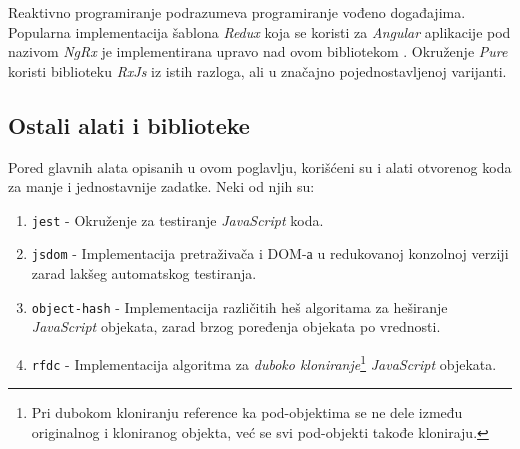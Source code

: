 \documentclass[12pt,oneside]{memoir}
\begin{document}
Reaktivno programiranje podrazumeva programiranje vođeno događajima. Popularna implementacija šablona \emph{Redux} koja se koristi za \emph{Angular} aplikacije
pod nazivom \emph{NgRx} je implementirana upravo nad ovom bibliotekom \cite{Redux} \cite{NgRx}. Okruženje \emph{Pure} koristi
biblioteku \emph{RxJs} iz istih razloga, ali u značajno pojednostavljenoj varijanti.
\subsection{Ostali alati i biblioteke}
Pored glavnih alata opisanih u ovom poglavlju, korišćeni su i alati otvorenog koda za manje i jednostavnije zadatke.
Neki od njih su:
\begin{enumerate}
  \item \texttt{jest} - Okruženje za testiranje \emph{JavaScript} koda.
  \item \texttt{jsdom} - Implementacija pretraživača i DOM-а u redukovanoj konzolnoj verziji zarad lakšeg automatskog testiranja.
  \item \texttt{object-hash} - Implementacija različitih heš algoritama za heširanje
  \emph{JavaScript} objekata, zarad brzog poređenja objekata po vrednosti.
  \item \texttt{rfdc} - Implementacija algoritma za \emph{duboko kloniranje}\footnote{Pri dubokom kloniranju reference ka pod-objektima se ne dele između originalnog i kloniranog objekta, već se svi pod-objekti takođe kloniraju.} \emph{JavaScript} objekata. 
\end{enumerate}
\end{document}
